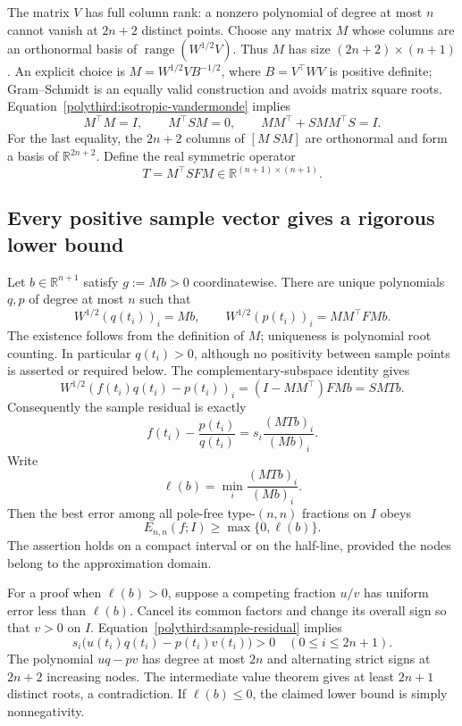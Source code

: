 \documentclass[11pt]{article}
\newcommand{\R}{\mathbb R}
\theoremstyle{remark}
\numberwithin{equation}{section}
\begin{document}
The matrix $V$ has full column rank: a nonzero polynomial of degree
at most $n$ cannot vanish at $2n+2$ distinct points.  Choose any
matrix $M$ whose columns are an orthonormal basis of
$\operatorname{range}(W^{1/2}V)$.  Thus $M$ has size
$(2n+2)\times(n+1)$.  An explicit choice is
$M=W^{1/2}VB^{-1/2}$, where $B=V^\top WV$ is positive definite;
Gram--Schmidt is an equally valid construction and avoids matrix
square roots.  Equation~\eqref{polythird:isotropic-vandermonde}
implies
\begin{equation}\label{polythird:orthogonal-split}
 M^\top M=I,\qquad M^\top SM=0,\qquad
 MM^\top+SMM^\top S=I.
\end{equation}
For the last equality, the $2n+2$ columns of $[M\;SM]$ are
orthonormal and form a basis of $\R^{2n+2}$.
Define the real symmetric operator
\begin{equation}\label{polythird:signed-compression}
 T=M^\top SFM\in\R^{(n+1)\times(n+1)}.
\end{equation}

\subsection{Every positive sample vector gives a rigorous lower bound}
Let $b\in\R^{n+1}$ satisfy $g:=Mb>0$ coordinatewise.  There are
unique polynomials $q,p$ of degree at most $n$ such that
\[
 W^{1/2}(q(t_i))_i=Mb,
 \qquad
 W^{1/2}(p(t_i))_i=MM^\top FMb.
\]
The existence follows from the definition of $M$; uniqueness is
polynomial root counting.  In particular $q(t_i)>0$, although no
positivity between sample points is asserted or required below.
The complementary-subspace identity gives
\[
 W^{1/2}(f(t_i)q(t_i)-p(t_i))_i
 =(I-MM^\top)FMb=SMTb.
\]
Consequently the sample residual is exactly
\begin{equation}\label{polythird:sample-residual}
 f(t_i)-\frac{p(t_i)}{q(t_i)}
 =s_i\frac{(MTb)_i}{(Mb)_i}.
\end{equation}
Write
\[
 \ell(b)=\min_i\frac{(MTb)_i}{(Mb)_i}.
\]
Then the best error among all pole-free type-$(n,n)$ fractions on
$I$ obeys
\begin{equation}\label{polythird:cone-certificate}
 E_{n,n}(f;I)\ge\max\{0,\ell(b)\}.
\end{equation}
The assertion holds on a compact interval or on the half-line,
provided the nodes belong to the approximation domain.

For a proof when $\ell(b)>0$, suppose a competing fraction $u/v$
has uniform error less than $\ell(b)$.  Cancel its common factors
and change its overall sign so that $v>0$ on $I$.
Equation~\eqref{polythird:sample-residual} implies
\[
 s_i\bigl(u(t_i)q(t_i)-p(t_i)v(t_i)\bigr)>0
          \quad(0\le i\le2n+1).
\]
The polynomial $uq-pv$ has degree at most $2n$ and alternating
strict signs at $2n+2$ increasing nodes.  The intermediate value
theorem gives at least $2n+1$ distinct roots, a contradiction.
If $\ell(b)\le0$, the claimed lower bound is simply nonnegativity.
\end{document}
